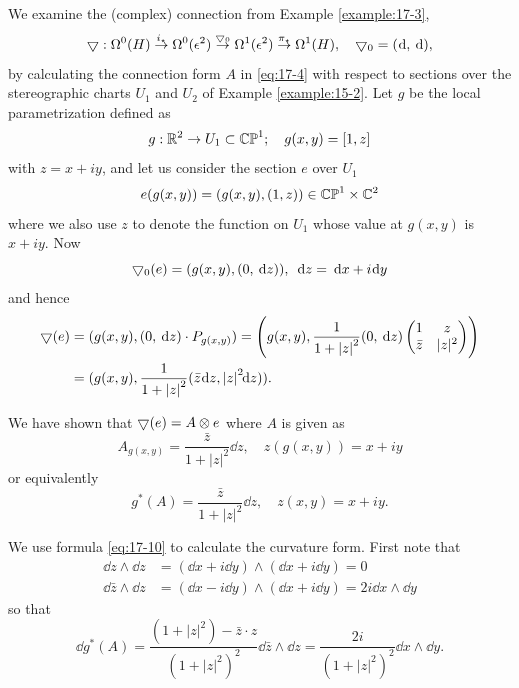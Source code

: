 \begin{example}
  We examine the (complex) connection from Example \ref{example:17-3},
  \[
    \btd:\Omega^0( H) \overset{{i}_{ \star  }}
    { \ra  }\Omega^0( {\epsilon }^{2}) \overset{\btd_0}
    { \ra  }\Omega^1( {\epsilon }^{2}) \overset{{\pi }_{ \star  }}
    { \ra  }\Omega^1( H),
    \quad\btd_0 = (\!{\dd,\dd}),
  \]
  by calculating the connection form $A$ in \eqref{eq:17-4} with respect to sections over the 
  stereographic charts ${U}_1$ and ${U}_{2}$ of Example \ref{example:15-2}. Let $g$ be the local parametrization 
  defined as
  \[
    g:{\mathbb{R}}^{2} \rightarrow  {U}_1 \subset  {\mathbb{{CP}}}^1;
    \quad g( x, y) = [  {1,z}]
  \]
  with $z = x + {iy}$, and let us consider the section $e$ over ${U}_1$
  \[
    e( {g( x, y) })  = ( {g( x, y),( {1,z}) })  \in  \mathbb{CP}^1\times{\ensuremath{\mathbb{C}}}^{2}
  \]
  where we also use $z$ to denote the function on ${U}_1$ whose value at $g( x, y)$ is $x + {iy}$. Now
  \[
    \btd_0( e)  = ( {g( x, y),( {0,{\dd z}}) }),\;{\dd z} = {\dd x} + {i\!\dd y}
  \]
  and hence
  \begin{align*}
    \btd ( e)  
    & = ( {g( x, y), ( {0,{\dd z}})  \cdot  {P}_{g( x, y) }})  
      = \left( 
        g( x, y), \frac1{1 + {\left| z\right| }^{2}}( {0,{\dd z}}) 
        \begin{pmatrix} 
          1 & z \\  
          \bar{z} & |z|^2
        \end{pmatrix}
        \right) \\
    & = ( {g( x, y), \frac1{1 + {\left| z\right| }^{2}}
      ( {\bar{z}\!\dd z,{\left| z\right| }^{2}\!\!{\dd z}}) }).
  \end{align*}

  We have shown that $\bigtriangledown  ( e)  = A \otimes  e$ where $A$ is given as
  \[
    {A}_{g( x, y) } = \frac{\bar{z}}{1 + {\left| z\right| }^{2}}{\dd z},\quad
    z( {g( x, y) }) = x + {iy}
  \]
  or equivalently
  \[
    {g}^{ * }( A)  = \frac{\bar{z}}{1 + {\left| z\right| }^{2}}{\dd z},\quad
    z( x, y)  = x + {iy}.
  \]

  We use formula \eqref{eq:17-10} to calculate the curvature form. First note that
  \begin{align*}
    {\dd z} \land  \!{\dd z}   & = ( \!{{\dd x} + {i\!\dd y}}) \land  ( \!{{\dd x} + {i\!\dd y}})  = 0\\
    \dd\bar{z} \land  \!{\dd z}  & = ( \!{{\dd x}- {i\!\dd y}})  \land  ( \!{{\dd x} + {i\!\dd y}})  = {2i\!\dd x} \land \!{\dd y}
  \end{align*}
  so that
  \[
    \dd{g}^{ * }( A)  
      = \frac{( {1 + {\left| z\right| }^{2}}) - \bar{z} \cdot  z}{{( 1 + {\left| z\right| }^{2}) }^{2}}
        \dd\bar{z} \land  \!{\dd z} 
      = \frac{2i}{{( 1 + {\left| z\right| }^{2}) }^{2}}{\dd x} \land  \!{\dd y}.
  \]


\end{example}
